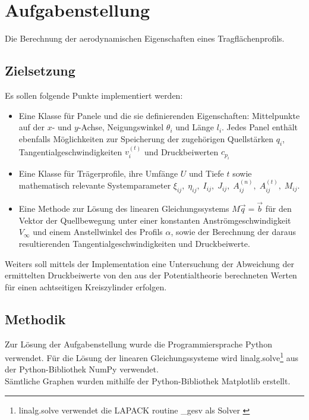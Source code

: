 \chapter{Aufgabenstellung}
Die Berechnung der aerodynamischen Eigenschaften eines Tragflächenprofils.

\section{Zielsetzung}
Es sollen folgende Punkte implementiert werden:
\begin{itemize}
  \item Eine Klasse für Panele und die sie definierenden Eigenschaften: Mittelpunkte auf der $x$- und $y$-Achse, Neigungswinkel $\theta_{i}$ und Länge $l_i$. Jedes Panel enthält ebenfalls Möglichkeiten zur Speicherung der zugehörigen Quellstärken $q_i$, Tangentialgeschwindigkeiten $v_i^{(t)}$ und Druckbeiwerten $c_{p_i}$
  \item Eine Klasse für Trägerprofile, ihre Umfänge $U$ und Tiefe $t$ sowie mathematisch relevante Systemparameter $\xi_{ij}, \; \eta_{ij}, \; I_{ij}, \; J_{ij}, \; A_{ij}^{(n)}, \;A_{ij}^{(t)}, \;M_{ij}$.
  \item Eine Methode zur Lösung des linearen Gleichungssystems $M \vec q = \vec b$ für den Vektor der Quellbewegung unter einer konstanten Anströmgeschwindigkeit $V_{\infty}$ und einem Anstellwinkel des Profils $\alpha $, sowie der Berechnung der daraus resultierenden Tangentialgeschwindigkeiten und Druckbeiwerte.
\end{itemize}
Weiters soll mittels der Implementation eine Untersuchung der Abweichung der ermittelten Druckbeiwerte von den aus der Potentialtheorie berechneten Werten für einen achtseitigen Kreiszylinder erfolgen.

\section{Methodik}
Zur Lösung der Aufgabenstellung wurde die Programmiersprache Python verwendet. Für die Lösung der linearen Gleichungssysteme wird linalg.solve\footnote{linalg.solve verwendet die LAPACK routine \_gesv als Solver \cite{harris2020array}} aus der Python-Bibliothek NumPy verwendet.\\Sämtliche Graphen wurden mithilfe der Python-Bibliothek Matplotlib erstellt. \cite{Hunter:2007}